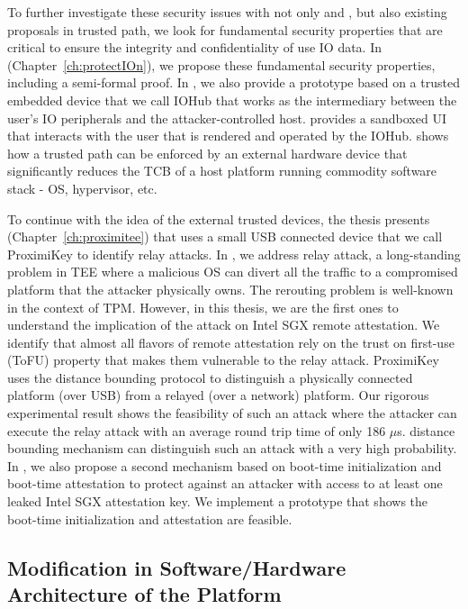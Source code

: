 To further investigate these security issues with not only \integrikey and \integriscreen, but also existing proposals in trusted path, we look for fundamental security properties that are critical to ensure the integrity and confidentiality of use IO data. In \protection (Chapter~\ref{ch:protectIOn}), we propose these fundamental security properties, including a semi-formal proof. In \protection, we also provide a prototype based on a trusted embedded device that we call IOHub that works as the intermediary between the user's IO peripherals and the attacker-controlled host. \protection provides a sandboxed UI that interacts with the user that is rendered and operated by the IOHub. \protection shows how a trusted path can be enforced by an external hardware device that significantly reduces the TCB of a host platform running commodity software stack - OS, hypervisor, etc.

To continue with the idea of the external trusted devices, the thesis presents \proximitee (Chapter~\ref{ch:proximitee}) that uses a small USB connected device that we call ProximiKey to identify relay attacks. In \proximitee, we address relay attack, a long-standing problem in TEE where a malicious OS can divert all the traffic to a compromised platform that the attacker physically owns. The rerouting problem is well-known in the context of TPM. However, in this thesis, we are the first ones to understand the implication of the attack on Intel SGX remote attestation. We identify that almost all flavors of remote attestation rely on the trust on first-use (ToFU) property that makes them vulnerable to the relay attack. ProximiKey uses the distance bounding protocol to distinguish a physically connected platform (over USB) from a relayed (over a network) platform. Our rigorous experimental result shows the feasibility of such an attack where the attacker can execute the relay attack with an average round trip time of only 186 $\mu$s. \proximitee distance bounding mechanism can distinguish such an attack with a very high probability. In \proximitee, we also propose a second mechanism based on boot-time initialization and boot-time attestation to protect against an attacker with access to at least one leaked Intel SGX attestation key. We implement a prototype that shows the boot-time initialization and attestation are feasible. 


\subsection{Modification in Software/Hardware Architecture of the Platform}

